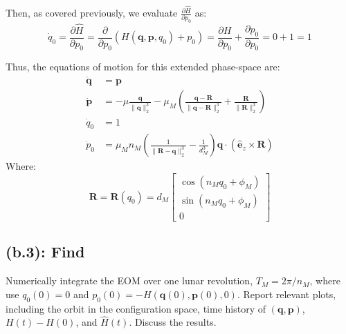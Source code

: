 \documentclass[titlepage]{article}
\begin{document}
Then, as covered previously, we evaluate $\frac{\partial\widehat{H}}{\partial p_0}$ as:
\begin{equation}
	\dot{q}_0=\frac{\partial\widehat{H}}{\partial p_0}=\frac{\partial}{\partial p_0}\left(H(\boldsymbol{q},\boldsymbol{p},q_0)+p_0\right)=\frac{\partial H}{\partial p_0}+\frac{\partial p_0}{\partial p_0}=0+1=1
\end{equation}

\begin{mdframed}[linewidth=1pt, innertopmargin=10pt, innerbottommargin=10pt]
	Thus, the equations of motion for this extended phase-space are:
	\begin{equation}
		\begin{split}
			\dot{\boldsymbol{q}}&=\boldsymbol{p} \\
			\dot{\boldsymbol{p}}&=-\mu\frac{\boldsymbol{q}}{\|\boldsymbol{q}\|_2^3}-\mu_M\left(\frac{\boldsymbol{q}-\boldsymbol{R}}{\|\boldsymbol{q}-\boldsymbol{R}\|_2^3}+\frac{\boldsymbol{R}}{\|\boldsymbol{R}\|_2^3}\right) \\
			\dot{q}_0&=1 \\
			\dot{p}_0&=\mu_Mn_M\left(\frac{1}{\|\boldsymbol{R}-\boldsymbol{q}\|_2^3}-\frac{1}{d_M^3}\right)\boldsymbol{q}\cdot\left(\hat{\boldsymbol{e}}_z\times\boldsymbol{R}\right)
		\end{split}
	\end{equation}
	Where:
	\begin{equation}
		\boldsymbol{R}=\boldsymbol{R}(q_0)=d_M
		\begin{bmatrix}
			\cos(n_Mq_0+\phi_M) \\
			\sin(n_Mq_0+\phi_M) \\
			0
		\end{bmatrix}
	\end{equation}
\end{mdframed}

\subsection*{(b.3): Find}

Numerically integrate the EOM over one lunar revolution, $T_M=2\pi/n_M$, where use $q_0(0)=0$ and $p_0(0)=-H(\boldsymbol{q}(0),\boldsymbol{p}(0),0)$. Report relevant plots, including the orbit in the configuration space, time history of $(\boldsymbol{q},\boldsymbol{p})$, $H(t)-H(0)$, and $\widehat{H}(t)$. Discuss the results. \\
\end{document}
